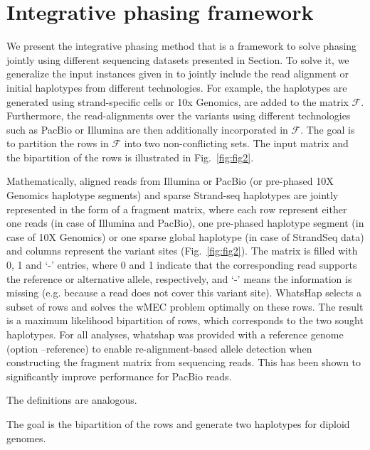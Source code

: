 \section{Integrative phasing framework}
We present the integrative phasing method that is a framework to solve phasing jointly using different sequencing datasets presented in Section.
To solve it, we generalize the input instances given in  to jointly include the read alignment or initial haplotypes from different technologies.
For example, the haplotypes are generated using strand-specific cells or 10x Genomics, are added to the matrix $\mathcal{F}$. Furthermore, the read-alignments over the variants using different technologies such as PacBio or Illumina are then additionally incorporated in $\mathcal{F}$.
The goal is to partition the rows in $\mathcal{F}$ into two non-conflicting sets.
The input matrix and the bipartition of the rows is illustrated in Fig.~\ref{fig:fig2}.

Mathematically, aligned reads from Illumina or PacBio (or pre-phased 10X Genomics haplotype segments) and sparse Strand-seq haplotypes are jointly represented in the form of a fragment matrix, where each  row represent either one reads (in case of Illumina and PacBio), 
one pre-phased haplotype segment (in case of 10X Genomics) or one sparse global haplotype (in case of StrandSeq data) and columns represent the variant sites (Fig.~\ref{fig:fig2}). 
The matrix is filled with 0, 1 and ‘-’ entries, where 0 and 1 indicate that the corresponding read supports the reference or alternative allele, respectively,  and ‘-’ means the information is missing 
(e.g. because a read does not cover this variant site). WhatsHap selects a subset of rows and solves the wMEC problem optimally on these rows. 
The result is a maximum likelihood bipartition of rows, which corresponds to the two sought haplotypes.
For all analyses, whatshap was provided with a reference genome (option --reference) to enable re-alignment-based allele detection when constructing the fragment matrix from sequencing reads. 
This has been shown to significantly improve performance for PacBio reads.

The definitions  are analogous. 

The goal is the bipartition of the rows and generate two haplotypes for diploid genomes.


